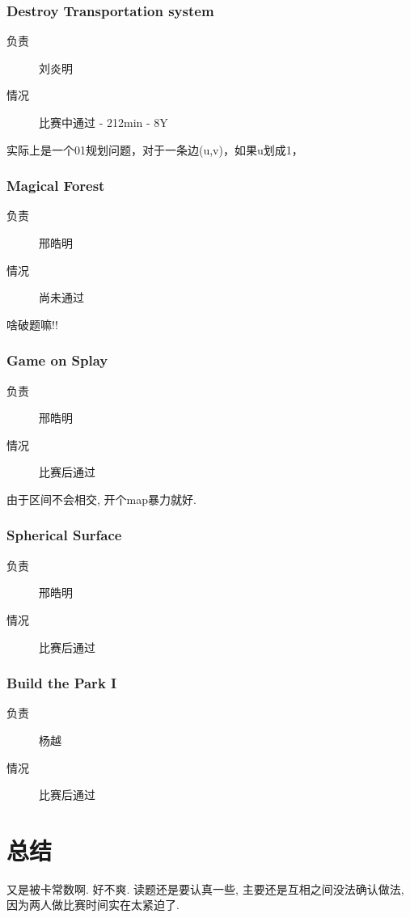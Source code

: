 \documentclass[a4paper, 11pt, nofonts, nocap, fancyhdr]{ctexart}
\newcommand{\problem}[1]{\subsubsection{#1}}
\begin{document}
\problem{Destroy Transportation system}

\begin{description}
\item[负责] 刘炎明
\item[情况] 比赛中通过 - 212min - 8Y
\end{description}

实际上是一个01规划问题，对于一条边(u,v)，如果u划成1，

\problem{Magical Forest}

\begin{description}
\item[负责] 邢皓明
\item[情况] 尚未通过
\end{description}

啥破题嘛!!

\problem{Game on Splay}

\begin{description}
\item[负责] 邢皓明
\item[情况] 比赛后通过
\end{description}

由于区间不会相交, 开个map暴力就好.

\problem{Spherical Surface}

\begin{description}
\item[负责] 邢皓明
\item[情况] 比赛后通过
\end{description}

\problem{Build the Park I}

\begin{description}
\item[负责] 杨越
\item[情况] 比赛后通过
\end{description}

\section{总结}

又是被卡常数啊. 好不爽. 读题还是要认真一些, 主要还是互相之间没法确认做法, 因为两人做比赛时间实在太紧迫了.
\end{document}
